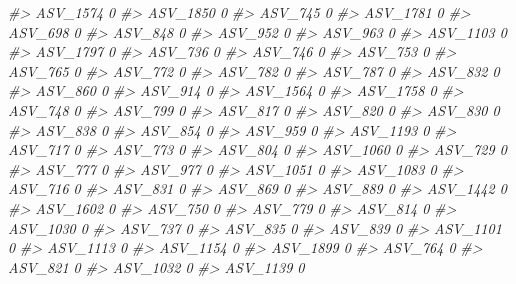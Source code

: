 \documentclass[
]{article}
\newenvironment{Shaded}{\begin{snugshade}}{\end{snugshade}}
\newcommand{\CommentTok}[1]{\textcolor[rgb]{0.56,0.35,0.01}{\textit{#1}}}
\begin{document}
\begin{Shaded}
\begin{Highlighting}[]
\CommentTok{\#\textgreater{} ASV\_1574  0}
\CommentTok{\#\textgreater{} ASV\_1850  0}
\CommentTok{\#\textgreater{} ASV\_745   0}
\CommentTok{\#\textgreater{} ASV\_1781  0}
\CommentTok{\#\textgreater{} ASV\_698   0}
\CommentTok{\#\textgreater{} ASV\_848   0}
\CommentTok{\#\textgreater{} ASV\_952   0}
\CommentTok{\#\textgreater{} ASV\_963   0}
\CommentTok{\#\textgreater{} ASV\_1103  0}
\CommentTok{\#\textgreater{} ASV\_1797  0}
\CommentTok{\#\textgreater{} ASV\_736   0}
\CommentTok{\#\textgreater{} ASV\_746   0}
\CommentTok{\#\textgreater{} ASV\_753   0}
\CommentTok{\#\textgreater{} ASV\_765   0}
\CommentTok{\#\textgreater{} ASV\_772   0}
\CommentTok{\#\textgreater{} ASV\_782   0}
\CommentTok{\#\textgreater{} ASV\_787   0}
\CommentTok{\#\textgreater{} ASV\_832   0}
\CommentTok{\#\textgreater{} ASV\_860   0}
\CommentTok{\#\textgreater{} ASV\_914   0}
\CommentTok{\#\textgreater{} ASV\_1564  0}
\CommentTok{\#\textgreater{} ASV\_1758  0}
\CommentTok{\#\textgreater{} ASV\_748   0}
\CommentTok{\#\textgreater{} ASV\_799   0}
\CommentTok{\#\textgreater{} ASV\_817   0}
\CommentTok{\#\textgreater{} ASV\_820   0}
\CommentTok{\#\textgreater{} ASV\_830   0}
\CommentTok{\#\textgreater{} ASV\_838   0}
\CommentTok{\#\textgreater{} ASV\_854   0}
\CommentTok{\#\textgreater{} ASV\_959   0}
\CommentTok{\#\textgreater{} ASV\_1193  0}
\CommentTok{\#\textgreater{} ASV\_717   0}
\CommentTok{\#\textgreater{} ASV\_773   0}
\CommentTok{\#\textgreater{} ASV\_804   0}
\CommentTok{\#\textgreater{} ASV\_1060  0}
\CommentTok{\#\textgreater{} ASV\_729   0}
\CommentTok{\#\textgreater{} ASV\_777   0}
\CommentTok{\#\textgreater{} ASV\_977   0}
\CommentTok{\#\textgreater{} ASV\_1051  0}
\CommentTok{\#\textgreater{} ASV\_1083  0}
\CommentTok{\#\textgreater{} ASV\_716   0}
\CommentTok{\#\textgreater{} ASV\_831   0}
\CommentTok{\#\textgreater{} ASV\_869   0}
\CommentTok{\#\textgreater{} ASV\_889   0}
\CommentTok{\#\textgreater{} ASV\_1442  0}
\CommentTok{\#\textgreater{} ASV\_1602  0}
\CommentTok{\#\textgreater{} ASV\_750   0}
\CommentTok{\#\textgreater{} ASV\_779   0}
\CommentTok{\#\textgreater{} ASV\_814   0}
\CommentTok{\#\textgreater{} ASV\_1030  0}
\CommentTok{\#\textgreater{} ASV\_737   0}
\CommentTok{\#\textgreater{} ASV\_835   0}
\CommentTok{\#\textgreater{} ASV\_839   0}
\CommentTok{\#\textgreater{} ASV\_1101  0}
\CommentTok{\#\textgreater{} ASV\_1113  0}
\CommentTok{\#\textgreater{} ASV\_1154  0}
\CommentTok{\#\textgreater{} ASV\_1899  0}
\CommentTok{\#\textgreater{} ASV\_764   0}
\CommentTok{\#\textgreater{} ASV\_821   0}
\CommentTok{\#\textgreater{} ASV\_1032  0}
\CommentTok{\#\textgreater{} ASV\_1139  0}

\end{Highlighting}
\end{Shaded}
\end{document}
